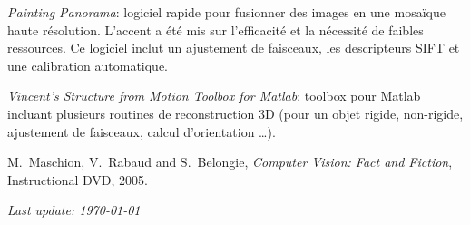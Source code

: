 \documentclass{article}
\begin{document}
\begin{llist}
{{\em Painting Panorama}: logiciel rapide pour fusionner des images en une mosa\"{i}que haute r\'{e}solution.  L'accent 
a \'{e}t\'{e} mis sur l'efficacit\'{e} et la n\'{e}cessit\'{e} de faibles ressources.  Ce logiciel inclut un ajustement 
de faisceaux, les descripteurs SIFT et une calibration automatique.

{\em Vincent's Structure from Motion Toolbox for Matlab}: toolbox pour Matlab incluant plusieurs routines de 
reconstruction 3D (pour un objet rigide, non-rigide, ajustement de faisceaux, calcul d'orientation \dots).
}

{
}
{
}


{
}
{
}


M.~Maschion, V.~Rabaud and S.~Belongie, {\em Computer Vision: Fact and Fiction},
Instructional DVD, 2005.





\end{llist}

{\em Last update: \today}
\end{document}
